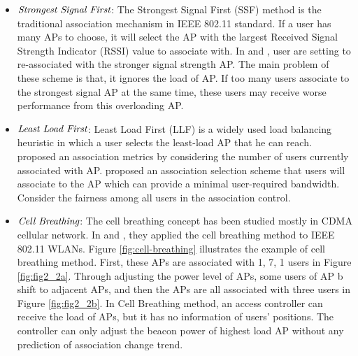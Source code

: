 \begin{itemize}
	\item $\emph{Strongest Signal First}$: The Strongest Signal First (SSF) method is the traditional association mechanism in IEEE 802.11 standard. If a user has many APs to choose, it will select the AP with the largest Received Signal Strength Indicator (RSSI) value to associate with. In \cite{teng2009d} and \cite{wu2007proactive}, user are setting to re-associated with the stronger signal strength AP. The main problem of these scheme is that, it ignores the load of AP. If too many users associate to the strongest signal AP at the same time, these users may receive worse performance from this overloading AP.
	\item $\emph{Least Load First}$: Least Load First (LLF) is a widely used load balancing heuristic in which a user selects the least-load AP that he can reach. \cite{papanikos2001study} proposed an association metrics by considering the number of users currently associated with AP. \cite{balachandran2002hot} proposed an association selection scheme that users will associate to the AP which can provide a minimal user-required bandwidth. \cite{bejerano2004fairness} Consider the fairness among all users in the association control.
	\item $\emph{Cell Breathing}$: The cell breathing concept has been studied mostly in CDMA cellular network. In \cite{bahl2007cell} and \cite{bejerano2009cell}, they applied the cell breathing method to IEEE 802.11 WLANs. Figure \ref{fig:cell-breathing} illustrates the example of cell breathing method. First, these APs are associated with 1, 7, 1 users in Figure \ref{fig:fig2_2a}. Through adjusting the power level of APs, some users of AP b shift to adjacent APs, and then the APs are all associated with three users in Figure \ref{fig:fig2_2b}. In Cell Breathing method, an access controller can receive the load of APs, but it has no information of users' positions. The controller can only adjust the beacon power of highest load AP without any prediction of association change trend.
\end{itemize}

